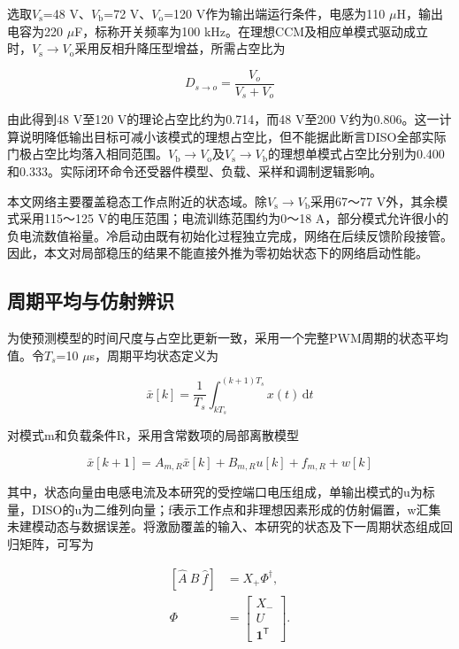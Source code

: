 \documentclass[UTF8,fontset=fandol,a4paper,twocolumn,10pt]{ctexart}
\begin{document}
选取$V_{\mathrm s}$=48 V、$V_{\mathrm b}$=72 V、$V_{\mathrm o}$=120 V作为输出端运行条件，电感为110 $\mu$H，输出电容为220 $\mu$F，标称开关频率为100 kHz。在理想CCM及相应单模式驱动成立时，$V_{\mathrm s}$$\to$$V_{\mathrm o}$采用反相升降压型增益，所需占空比为

\begin{equation}D_{s\to o}=\frac{V_o}{V_s+V_o}\label{eq:12}\end{equation}

由此得到48 V至120 V的理论占空比约为0.714，而48 V至200 V约为0.806。这一计算说明降低输出目标可减小该模式的理想占空比，但不能据此断言DISO全部实际门极占空比均落入相同范围。$V_{\mathrm b}$$\to$$V_{\mathrm o}$及$V_{\mathrm s}$$\to$$V_{\mathrm b}$的理想单模式占空比分别为0.400和0.333。实际闭环命令还受器件模型、负载、采样和调制逻辑影响。

本文网络主要覆盖稳态工作点附近的状态域。除$V_{\mathrm s}$$\to$$V_{\mathrm b}$采用67～77 V外，其余模式采用115～125 V的电压范围；电流训练范围约为0～18 A，部分模式允许很小的负电流数值裕量。冷启动由既有初始化过程独立完成，网络在后续反馈阶段接管。因此，本文对局部稳压的结果不能直接外推为零初始状态下的网络启动性能。


\subsection{周期平均与仿射辨识}

为使预测模型的时间尺度与占空比更新一致，采用一个完整PWM周期的状态平均值。令$T_s$=10 $\mu$s，周期平均状态定义为

\begin{equation}\bar{x}[k]=\frac{1}{T_s}\int_{kT_s}^{(k+1)T_s}x(t)\,\mathrm{d}t\label{eq:13}\end{equation}

对模式m和负载条件R，采用含常数项的局部离散模型

\begin{equation}\bar{x}[k+1]=A_{m,R}\bar{x}[k]+B_{m,R}u[k]+f_{m,R}+w[k]\label{eq:14}\end{equation}

其中，状态向量由电感电流及本研究的受控端口电压组成，单输出模式的u为标量，DISO的u为二维列向量；f表示工作点和非理想因素形成的仿射偏置，w汇集未建模动态与数据误差。将激励覆盖的输入、本研究的状态及下一周期状态组成回归矩阵，可写为

\begin{equation}\begin{aligned}[\hat A\ \hat B\ \hat f]&=X_+\Phi^\dagger,\\ \Phi&=\begin{bmatrix}X_-\\ U\\ \mathbf 1^{\mathsf T}\end{bmatrix}.\end{aligned}\label{eq:15}\end{equation}
\end{document}
